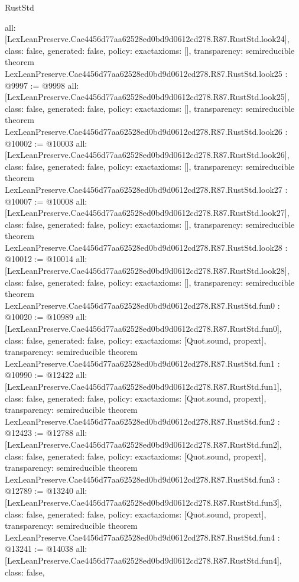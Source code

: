\begin{lexlean}{RustStd}
\begin{coremodule}
{  all: [LexLeanPreserve.Cae4456d77aa62528ed0bd9d0612cd278.R87.RustStd.look24],
  class: false,
  generated: false,
  policy: exact{axioms: []},
  transparency: semireducible
}
theorem LexLeanPreserve.Cae4456d77aa62528ed0bd9d0612cd278.R87.RustStd.look25 : @9997 := @9998 {
  all: [LexLeanPreserve.Cae4456d77aa62528ed0bd9d0612cd278.R87.RustStd.look25],
  class: false,
  generated: false,
  policy: exact{axioms: []},
  transparency: semireducible
}
theorem LexLeanPreserve.Cae4456d77aa62528ed0bd9d0612cd278.R87.RustStd.look26 : @10002 := @10003 {
  all: [LexLeanPreserve.Cae4456d77aa62528ed0bd9d0612cd278.R87.RustStd.look26],
  class: false,
  generated: false,
  policy: exact{axioms: []},
  transparency: semireducible
}
theorem LexLeanPreserve.Cae4456d77aa62528ed0bd9d0612cd278.R87.RustStd.look27 : @10007 := @10008 {
  all: [LexLeanPreserve.Cae4456d77aa62528ed0bd9d0612cd278.R87.RustStd.look27],
  class: false,
  generated: false,
  policy: exact{axioms: []},
  transparency: semireducible
}
theorem LexLeanPreserve.Cae4456d77aa62528ed0bd9d0612cd278.R87.RustStd.look28 : @10012 := @10014 {
  all: [LexLeanPreserve.Cae4456d77aa62528ed0bd9d0612cd278.R87.RustStd.look28],
  class: false,
  generated: false,
  policy: exact{axioms: []},
  transparency: semireducible
}
theorem LexLeanPreserve.Cae4456d77aa62528ed0bd9d0612cd278.R87.RustStd.fun0 : @10020 := @10989 {
  all: [LexLeanPreserve.Cae4456d77aa62528ed0bd9d0612cd278.R87.RustStd.fun0],
  class: false,
  generated: false,
  policy: exact{axioms: [Quot.sound, propext]},
  transparency: semireducible
}
theorem LexLeanPreserve.Cae4456d77aa62528ed0bd9d0612cd278.R87.RustStd.fun1 : @10990 := @12422 {
  all: [LexLeanPreserve.Cae4456d77aa62528ed0bd9d0612cd278.R87.RustStd.fun1],
  class: false,
  generated: false,
  policy: exact{axioms: [Quot.sound, propext]},
  transparency: semireducible
}
theorem LexLeanPreserve.Cae4456d77aa62528ed0bd9d0612cd278.R87.RustStd.fun2 : @12423 := @12788 {
  all: [LexLeanPreserve.Cae4456d77aa62528ed0bd9d0612cd278.R87.RustStd.fun2],
  class: false,
  generated: false,
  policy: exact{axioms: [Quot.sound, propext]},
  transparency: semireducible
}
theorem LexLeanPreserve.Cae4456d77aa62528ed0bd9d0612cd278.R87.RustStd.fun3 : @12789 := @13240 {
  all: [LexLeanPreserve.Cae4456d77aa62528ed0bd9d0612cd278.R87.RustStd.fun3],
  class: false,
  generated: false,
  policy: exact{axioms: [Quot.sound, propext]},
  transparency: semireducible
}
theorem LexLeanPreserve.Cae4456d77aa62528ed0bd9d0612cd278.R87.RustStd.fun4 : @13241 := @14038 {
  all: [LexLeanPreserve.Cae4456d77aa62528ed0bd9d0612cd278.R87.RustStd.fun4],
  class: false,
}
\end{coremodule}
\end{lexlean}
